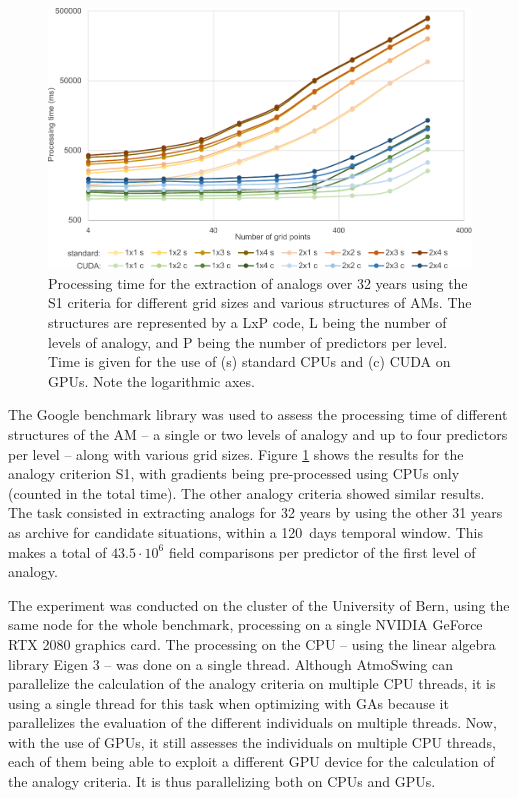 \documentclass[draft]{agujournal2019}
\begin{document}
\begin{figure}
	\noindent\includegraphics[width=130mm]{figures/cuda-timing.pdf}
	\caption{Processing time for the extraction of analogs over 32 years using the S1 criteria for different grid sizes and various structures of AMs. The structures are represented by a LxP code, L being the number of levels of analogy, and P being the number of predictors per level. Time is given for the use of (s) standard CPUs and (c) CUDA on GPUs. Note the logarithmic axes.}
	\label{cuda}
\end{figure}

The Google benchmark library was used to assess the processing time of different structures of the AM -- a single or two levels of analogy and up to four predictors per level -- along with various grid sizes. Figure \ref{cuda} shows the results for the analogy criterion S1, with gradients being pre-processed using CPUs only (counted in the total time). The other analogy criteria showed similar results. The task consisted in extracting analogs for 32 years by using the other 31 years as archive for candidate situations, within a 120~days temporal window. This makes a total of $43.5\cdot10^6$ field comparisons per predictor of the first level of analogy.

The experiment was conducted on the cluster of the University of Bern, using the same node for the whole benchmark, processing on a single NVIDIA GeForce RTX 2080 graphics card. The processing on the CPU -- using the linear algebra library Eigen 3 \cite{Guennebaud2010} -- was done on a single thread. Although AtmoSwing can parallelize the calculation of the analogy criteria on multiple CPU threads, it is using a single thread for this task when optimizing with GAs because it parallelizes the evaluation of the different individuals on multiple threads. Now, with the use of GPUs, it still assesses the individuals on multiple CPU threads, each of them being able to exploit a different GPU device for the calculation of the analogy criteria. It is thus parallelizing both on CPUs and GPUs.
\end{document}
